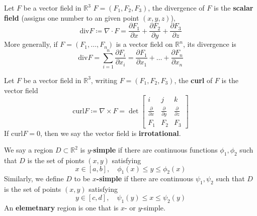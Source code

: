 \documentclass[openany]{book}
\newcommand{\curl}{\text{curl}}
\newcommand{\diverg}{\text{div}}
\newcommand{\R}{\mathbb{R}}
\begin{document}
\begin{defn}[divergence]
    Let ${F}$ be a vector field in $\R^3$ $F=(F_1,F_2,F_3)$, the divergence of ${F}$ is the \textbf{scalar field} (assigns one number to an given point $(x, y, z)$), 
    \begin{equation*}
        \diverg F\coloneq\nabla\cdot F=\frac{\partial F_1}{\partial x}+\frac{\partial F_2}{\partial y}+\frac{\partial F_3}{\partial z}
    \end{equation*}
    More generally, if $F=(F_1,\dots, F_n)$ is a vector field on $\R^n$, its divergence is 
    \begin{equation*}
        \diverg F=\sum_{i=1}^n\frac{\partial F_i}{\partial x_i}=\frac{\partial F_1}{\partial x_1}+\dots+\frac{\partial F_n}{\partial x_n}
    \end{equation*}
\end{defn}


\begin{defn}[curl]
    Let $F$ be a vector field in $\R^3$, writing $F=(F_1,F_2,F_3)$, the \textbf{curl} of $F$ is the vector field 
    \begin{equation*}
        \curl F\coloneq\nabla\times F=\det\begin{bmatrix}
            i&j&k\\
            \frac{\partial}{\partial x}&\frac{\partial}{\partial y}&\frac{\partial}{\partial z}\\
            F_1&F_2&F_3
        \end{bmatrix}
    \end{equation*}
    If $\curl F=0$, then we say the vector field is \textbf{irrotational}.
\end{defn}



\begin{defn}
    We say a region $D\subset\R^2$ is \boldmath$y$\unboldmath-\textbf{simple} if there are continuous functions $\phi_1,\phi_2$ such that $D$ is the set of pionts $(x,y)$ satisfying
    \begin{equation*}
        x\in[a,b], \quad  \phi_1(x)\leq y\leq\phi_2(x)
    \end{equation*}
    Similarly, we define $D$ to be \boldmath$x$\textbf{-simple} \unboldmath if there are continuous $\psi_1, \psi_2$ such that $D$ is the set of points $(x,y)$ satisfying 
    \begin{equation*}
        y\in[c,d], \quad \psi_1(y)\leq x\leq\psi_2(y)
    \end{equation*}
    An \textbf{elemetnary} region is one that is $x$- or $y$-simple.
\end{defn}
\end{document}
